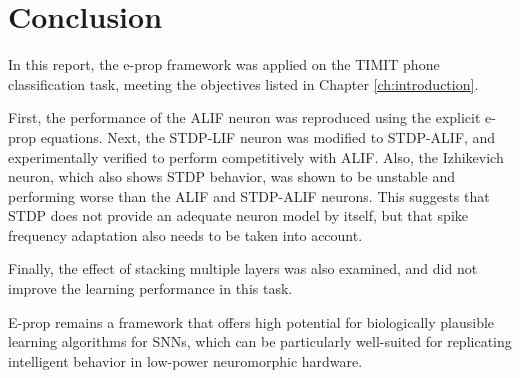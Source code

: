 \chapter{Conclusion}\label{ch:conclusion}

In this report, the e-prop framework was applied on the TIMIT phone classification task, meeting the objectives listed in Chapter \ref{ch:introduction}.

First, the performance of the ALIF neuron was reproduced using the explicit e-prop equations.
Next, the STDP-LIF neuron was modified to STDP-ALIF, and experimentally verified to perform competitively with ALIF.
Also, the Izhikevich neuron, which also shows STDP behavior, was shown to be unstable and performing worse than the ALIF and STDP-ALIF neurons.
This suggests that STDP does not provide an adequate neuron model by itself, but that \eg spike frequency adaptation also needs to be taken into account.

Finally, the effect of stacking multiple layers was also examined, and did not improve the learning performance in this task.

E-prop remains a framework that offers high potential for biologically plausible learning algorithms for SNNs, which can be particularly well-suited for replicating intelligent behavior in low-power neuromorphic hardware.
